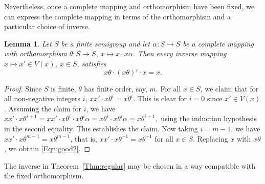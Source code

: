 \documentclass[11pt]{article}
\theoremstyle{plain}
\newtheorem{lemma}[theorem]{Lemma}
\theoremstyle{remark}
\theoremstyle{definition}
\theoremstyle{plain}
\newcommand{\inv}{^{-1}}
\begin{document}
Nevertheless, once a complete mapping and orthomorphism have been fixed, we can express the complete mapping in terms of the orthomorphism
and a particular choice of inverse.

\begin{lemma}\label{Lem:pregood_inverse}
Let $S$ be a finite semigroup and let $\alpha\colon S\to S$ be a complete mapping with orthomorphism $\theta\colon S\to S,\ x\mapsto x\cdot x\alpha$. Then every inverse mapping $x\mapsto x'\in V(x)$, $x\in S$, satisfies
\begin{equation}\label{Eqn:good2}
x\theta\cdot (x\theta)'\cdot x = x.
\end{equation}
\end{lemma}
\begin{proof}
Since $S$ is finite, $\theta$ has finite order, say, $m$.
For all $x\in S$, we claim that for all non-negative integers $i$, $xx'\cdot x\theta^i = x\theta^i$. This is clear for $i=0$ since $x'\in V(x)$.
Assuming the claim for $i$, we have
\(xx'\cdot x\theta^{i+1}=xx'\cdot x\theta^i\cdot x\theta^i\alpha=x\theta^i\cdot x\theta^i\alpha=x\theta^{i+1},\)
using the induction hypothesis in the second equality. This establishes the claim. Now taking $i = m-1$, we have $xx'\cdot x\theta^{m-1} = x\theta^{m-1}$, that is, $xx'\cdot x\theta\inv = x\theta\inv$ for all $x\in S$. Replacing $x$ with $x\theta$, we obtain \eqref{Eqn:good2}.
\end{proof}

The inverse in Theorem~\ref{Thm:regular} may be chosen in a way compatible with the fixed orthomorphism.
\end{document}
